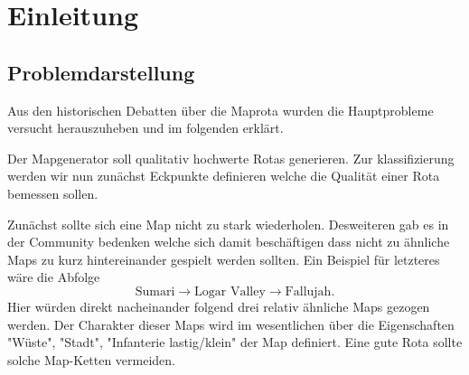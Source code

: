 \section{Einleitung}

        \subsection{Problemdarstellung}
            Aus den historischen Debatten über die Maprota wurden die Hauptprobleme versucht herauszuheben und im folgenden erklärt.

            Der Mapgenerator soll qualitativ hochwerte Rotas generieren.
            Zur klassifizierung werden wir nun zunächst Eckpunkte definieren welche die Qualität einer Rota bemessen sollen.

            Zunächst sollte sich eine Map nicht zu stark wiederholen.
            Desweiteren gab es in der Community bedenken welche sich damit beschäftigen dass nicht zu ähnliche Maps zu kurz hintereinander gespielt werden sollten. 
            Ein Beispiel für letzteres wäre die Abfolge 
            \begin{equation*}
                \text{Sumari} \rightarrow \text{Logar Valley} \rightarrow \text{Fallujah}.
            \end{equation*}
            Hier würden direkt nacheinander folgend drei relativ ähnliche Maps gezogen werden. 
            Der Charakter dieser Maps wird im wesentlichen über die Eigenschaften "Wüste", "Stadt", "Infanterie lastig/klein" der Map definiert.
            Eine gute Rota sollte solche Map-Ketten vermeiden.

